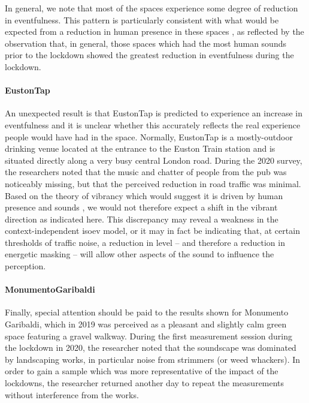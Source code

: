    In general, we note that most of the spaces experience some degree of reduction in eventfulness. This pattern is particularly consistent with what would be expected from a reduction in human presence in these spaces \citep{Aletta2018Towards}, as reflected by the observation that, in general, those spaces which had the most human sounds prior to the lockdown showed the greatest reduction in eventfulness during the lockdown.

   \paragraph{EustonTap} An unexpected result is that EustonTap is predicted to experience an increase in eventfulness and it is unclear whether this accurately reflects the real experience people would have had in the space. Normally, EustonTap is a mostly-outdoor drinking venue located at the entrance to the Euston Train station and is situated directly along a very busy central London road. During the 2020 survey, the researchers noted that the music and chatter of people from the pub was noticeably missing, but that the perceived reduction in road traffic was minimal. Based on the theory of vibrancy which would suggest it is driven by human presence and sounds \citep{Aletta2018Towards}, we would not therefore expect a shift in the vibrant direction as indicated here. This discrepancy may reveal a weakness in the context-independent \gls{isoev} model, or it may in fact be indicating that, at certain thresholds of traffic noise, a reduction in level -- and therefore a reduction in energetic masking -- will allow other aspects of the sound to influence the perception.

   \paragraph{MonumentoGaribaldi} Finally, special attention should be paid to the results shown for Monumento Garibaldi, which in 2019 was perceived as a pleasant and slightly calm green space featuring a gravel walkway. During the first measurement session during the lockdown in 2020, the researcher noted that the soundscape was dominated by landscaping works, in particular noise from strimmers (or weed whackers). In order to gain a sample which was more representative of the impact of the lockdowns, the researcher returned another day to repeat the measurements without interference from the works.

